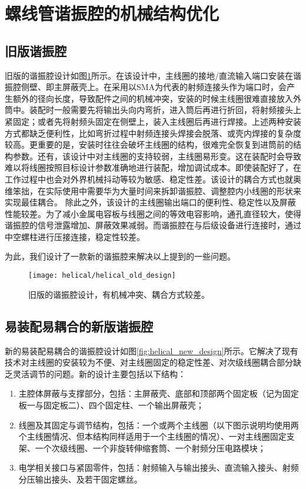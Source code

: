 \newpage
\section[螺线管谐振腔的机械结构优化]{螺线管谐振腔的机械结构优化}

\subsection[旧版谐振腔]{旧版谐振腔}
旧版的谐振腔设计如图\ref{fig:helical_old_design}所示。在该设计中，主线圈的接地/直流输入端口安装在谐振腔侧壁、即主屏蔽壳上。在采用以SMA为代表的射频连接头作为端口时，会产生额外的径向长度，导致配件之间的机械冲突，安装的时候主线圈很难直接放入外筒中。装配时一般需要先将输出头向内弯折，进入筒后再进行折回，将射频接头上紧固定；或者先将射频头固定在侧壁上，装入主线圈后再进行焊接。上述两种安装方式都缺乏便利性，比如弯折过程中射频连接头焊接会脱落、或壳内焊接的复杂度较高。更重要的是，安装时往往会破坏主线圈的结构，很难完全恢复到进筒前的结构参数。还有，该设计中对主线圈的支持较弱，主线圈易形变。这在装配时会导致难以将线圈按照目标设计参数准确地进行装配，增加调试成本。即使装配好了，在工作过程中也会对外界机械抖动等较为敏感、稳定性差。该设计的耦合方式也就奥维笨拙，在实际使用中需要华为大量时间来拆卸谐振腔、调整腔内小线圈的形状来实现最佳耦合。
除此之外，该设计的主线圈输出端口的便利性、稳定性以及屏蔽性能较差。为了减小金属电容板与线圈之间的等效电容影响，通孔直径较大，使得谐振腔的信号泄露增加、屏蔽效果减弱。而谐振腔在与后级设备进行连接时，通过中空螺柱进行压接连接，稳定性较差。

为此，我们设计了一款新的谐振腔来解决以上提到的一些问题。

\begin{figure}
    \centering
    \caption[旧版的谐振腔设计]{旧版的谐振腔设计，有机械冲突、耦合方式较差。\label{fig:helical_old_design}}
    \texttt{[image: helical/helical\_old\_design]}
\end{figure}
\subsection[易装配易耦合的新版谐振腔]{易装配易耦合的新版谐振腔}
新的易装配易耦合的谐振腔设计如图\ref{fig:helical_new_design}所示。它解决了现有技术对主线圈的安装较为不便、对主线圈固定的稳定性差、对次级线圈耦合部分缺乏灵活调节的问题。新的设计主要包括以下结构：
\begin{enumerate}
    \item 主腔体屏蔽与支撑部分，包括：主屏蔽壳、底部和顶部两个固定板（记为固定板一与固定板二）、四个固定柱、一个输出屏蔽壳；
    \item 线圈及其固定与调节结构，包括：一个或两个主线圈（以下图示说明均使用两个主线圈情况、但本结构同样适用于一个主线圈的情况）、一对主线圈固定支架、一个次级线圈、一个非旋转伸缩套筒、一个射频分压电路模块；
    \item 电学相关接口与紧固零件，包括：射频输入与输出接头、直流输入接头、射频分压输出接头、及若干固定螺丝。
\end{enumerate}

